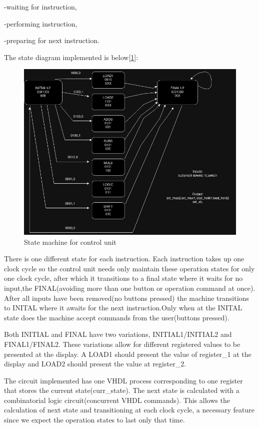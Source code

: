 \documentclass[12pt]{article}
\begin{document}
-waiting for instruction, 

-performing instruction,

-preparing for next instruction.

The state diagram implemented is below[\ref{fig:FSM}]:
\begin{figure}[H]
	\centering
	\includegraphics[width=0.8\linewidth]{Imagens/state_machine_lab1.jpg}
	\caption{State machine for control unit}
	\label{fig:FSM}
\end{figure}

There is one different state for each instruction. Each instruction takes up one clock cycle so the control unit needs only maintain these operation states for only one clock cycle, after which it transitions to a final state where it waits for no input,the FINAL(avoiding more than one button or operation command at once). After all inputs have been removed(no buttons pressed) the machine transitions to INITAL where it awaits for the next instruction.Only when at the INITAL state does the machine accept commands from the user(buttons pressed).

Both INITIAL and FINAL have two variations, INITIAL1/INITIAL2 and FINAL1/FINAL2. These variations allow for different registered values to be presented at the display. A LOAD1 should present the value of register\_1 at the display and LOAD2 should present the value at register\_2.

The circuit implemented has one VHDL process corresponding to one register that stores the current state(curr\_state). The next state is calculated with a combinatorial logic circuit(concurrent VHDL commands). This allows the calculation of next state and transitioning at each clock cycle, a necessary feature since we expect the operation states to last only that time.
\end{document}
